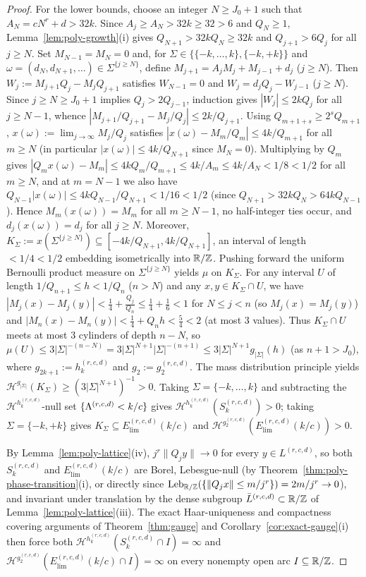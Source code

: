 \begin{proof}
For the lower bounds, choose an integer $N\ge J_0+1$ such that
$A_N=cN^r+d>32k$. Since $A_j\ge A_N>32k\ge32>6$ and $Q_N\ge1$, Lemma~\ref{lem:poly-growth}(i)
gives $Q_{N+1}>32kQ_N\ge32k$ and $Q_{j+1}>6Q_j$ for all $j\ge N$. Set
$M_{N-1}=M_N=0$ and, for $\Sigma\in\{\{-k,\dots,k\},\{-k,+k\}\}$ and
$\omega=(d_N,d_{N+1},\dots)\in\Sigma^{\{j\ge N\}}$, define $M_{j+1}=A_jM_j+M_{j-1}+d_j$
($j\ge N$). Then $W_j:=M_{j+1}Q_j-M_jQ_{j+1}$ satisfies $W_{N-1}=0$ and
$W_j=d_jQ_j-W_{j-1}$ ($j\ge N$). Since $j\ge N\ge J_0+1$ implies $Q_j>2Q_{j-1}$,
induction gives $|W_j|\le2kQ_j$ for all $j\ge N-1$, whence
$|M_{j+1}/Q_{j+1}-M_j/Q_j|\le2k/Q_{j+1}$. Using $Q_{m+1+s}\ge2^sQ_{m+1}$,
$x(\omega):=\lim_{j\to\infty}M_j/Q_j$ satisfies $|x(\omega)-M_m/Q_m|\le4k/Q_{m+1}$
for all $m\ge N$ (in particular $|x(\omega)|\le4k/Q_{N+1}$ since $M_N=0$).
Multiplying by $Q_m$ gives $|Q_mx(\omega)-M_m|\le4kQ_m/Q_{m+1}\le4k/A_m\le4k/A_N<1/8<1/2$
for all $m\ge N$, and at $m=N-1$ we also have $Q_{N-1}|x(\omega)|\le4kQ_{N-1}/Q_{N+1}<1/16<1/2$
(since $Q_{N+1}>32kQ_N>64kQ_{N-1}$). Hence $M_m(x(\omega))=M_m$ for all $m\ge N-1$,
no half-integer ties occur, and $d_j(x(\omega))=d_j$ for all $j\ge N$. Moreover,
$K_\Sigma:=x(\Sigma^{\{j\ge N\}})\subseteq[-4k/Q_{N+1},4k/Q_{N+1}]$, an interval
of length $<1/4<1/2$ embedding isometrically into $\mathbb{R}/\mathbb{Z}$. Pushing forward the
uniform Bernoulli product measure on $\Sigma^{\{j\ge N\}}$ yields $\mu$ on $K_\Sigma$.
For any interval $U$ of length $1/Q_{n+1}\le h<1/Q_n$ ($n>N$) and any $x,y\in K_\Sigma\cap U$,
we have $|M_j(x)-M_j(y)|<\frac14+\frac{Q_j}{Q_n}\le\frac14+\frac16<1$ for $N\le j<n$
(so $M_j(x)=M_j(y)$) and $|M_n(x)-M_n(y)|<\frac14+Q_nh<\frac54<2$ (at most $3$ values).
Thus $K_\Sigma\cap U$ meets at most $3$ cylinders of depth $n-N$, so
$\mu(U)\le3|\Sigma|^{-(n-N)}=3|\Sigma|^{N+1}|\Sigma|^{-(n+1)}\le3|\Sigma|^{N+1}g_{|\Sigma|}(h)$
(as $n+1>J_0$), where $g_{2k+1}:=h_k^{(r,c,d)}$ and $g_2:=g_2^{(r,c,d)}$. The
mass distribution principle yields $\mathcal H^{g_{|\Sigma|}}(K_\Sigma)\ge(3|\Sigma|^{N+1})^{-1}>0$.
Taking $\Sigma=\{-k,\dots,k\}$ and subtracting the $\mathcal H^{h_k^{(r,c,d)}}$-null
set $\{\Lambda^{(r,c,d)}<k/c\}$ gives $\mathcal H^{h_k^{(r,c,d)}}(S_k^{(r,c,d)})>0$;
taking $\Sigma=\{-k,+k\}$ gives $K_\Sigma\subseteq E_{\mathrm{lim}}^{(r,c,d)}(k/c)$
and $\mathcal H^{g_2^{(r,c,d)}}(E_{\mathrm{lim}}^{(r,c,d)}(k/c))>0$.

By Lemma~\ref{lem:poly-lattice}(iv), $j^r\|Q_jy\|\to0$ for every $y\in L^{(r,c,d)}$,
so both $S_k^{(r,c,d)}$ and $E_{\mathrm{lim}}^{(r,c,d)}(k/c)$ are Borel,
Lebesgue-null (by Theorem~\ref{thm:poly-phase-transition}(i), or directly since
$\operatorname{Leb}_{\mathbb{R}/\mathbb{Z}}(\{\|Q_jx\|\le m/j^r\})=2m/j^r\to0$), and invariant
under translation by the dense subgroup $\bar L^{(r,c,d)}\subset\mathbb{R}/\mathbb{Z}$ of
Lemma~\ref{lem:poly-lattice}(iii). The exact Haar-uniqueness and compactness
covering arguments of Theorem~\ref{thm:gauge} and Corollary~\ref{cor:exact-gauge}(i)
then force both $\mathcal H^{h_k^{(r,c,d)}}(S_k^{(r,c,d)}\cap I)=\infty$ and
$\mathcal H^{g_2^{(r,c,d)}}(E_{\mathrm{lim}}^{(r,c,d)}(k/c)\cap I)=\infty$ on
every nonempty open arc $I\subseteq\mathbb{R}/\mathbb{Z}$.


\end{proof}
